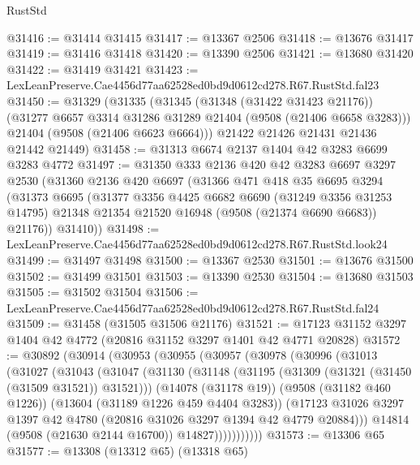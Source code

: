 \begin{lexlean}{RustStd}
\begin{coremodule}
@31416 := @31414 @31415
@31417 := @13367 @2506
@31418 := @13676 @31417
@31419 := @31416 @31418
@31420 := @13390 @2506
@31421 := @13680 @31420
@31422 := @31419 @31421
@31423 := LexLeanPreserve.Cae4456d77aa62528ed0bd9d0612cd278.R67.RustStd.fal23
@31450 := @31329
    (@31335
      (@31345
        (@31348 (@31422 @31423 @21176))
        (@31277 @6657 @3314 @31286 @31289 @21404 (@9508 (@21406 @6658 @3283)))
        @21404
        (@9508 (@21406 @6623 @6664)))
      @21422
      @21426
      @21431
      @21436
      @21442
      @21449)
@31458 := @31313 @6674 @2137 @1404 @42 @3283 @6699 @3283 @4772
@31497 := @31350
    @333
    @2136
    @420
    @42
    @3283
    @6697
    @3297
    @2530
    (@31360
      @2136
      @420
      @6697
      (@31366
        @471
        @418
        @35
        @6695
        @3294
        (@31373
          @6695
          (@31377
            @3356
            @4425
            @6682
            @6690
            (@31249 @3356 @31253 @14795)
            @21348
            @21354
            @21520
            @16948
            (@9508 (@21374 @6690 @6683))
            @21176))
        @31410))
@31498 := LexLeanPreserve.Cae4456d77aa62528ed0bd9d0612cd278.R67.RustStd.look24
@31499 := @31497 @31498
@31500 := @13367 @2530
@31501 := @13676 @31500
@31502 := @31499 @31501
@31503 := @13390 @2530
@31504 := @13680 @31503
@31505 := @31502 @31504
@31506 := LexLeanPreserve.Cae4456d77aa62528ed0bd9d0612cd278.R67.RustStd.fal24
@31509 := @31458 (@31505 @31506 @21176)
@31521 := @17123 @31152 @3297 @1404 @42 @4772 (@20816 @31152 @3297 @1401 @42 @4771 @20828)
@31572 := @30892
    (@30914
      (@30953
        (@30955
          (@30957
            (@30978
              (@30996
                (@31013
                  (@31027
                    (@31043
                      (@31047
                        (@31130
                          (@31148
                            (@31195 (@31309 (@31321 (@31450 (@31509 @31521)) @31521)))
                            (@14078 (@31178 @19))
                            (@9508 (@31182 @460 @1226))
                            (@13604 (@31189 @1226 @459 @4404 @3283))
                            (@17123
                              @31026
                              @3297
                              @1397
                              @42
                              @4780
                              (@20816 @31026 @3297 @1394 @42 @4779 @20884)))
                          @14814
                          (@9508 (@21630 @2144 @16700))
                          @14827)))))))))))
@31573 := @13306 @65
@31577 := @13308 (@13312 @65) (@13318 @65)

\end{coremodule}
\end{lexlean}
